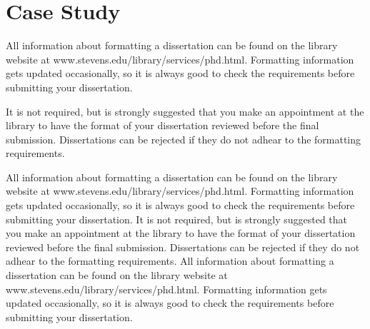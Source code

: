 \chapter{Case Study}
All information about formatting a dissertation can be found on the library website at www.stevens.edu/library/services/phd.html.  Formatting information gets updated occasionally, so it is always good to check the requirements before submitting your dissertation.  

It is not required, but is strongly suggested that you make an appointment at the library to have the format of your dissertation reviewed before the final submission.  Dissertations can be rejected if they do not adhear to the formatting requirements.   

All information about formatting a dissertation can be found on the library website at www.stevens.edu/library/services/phd.html.  Formatting information gets updated occasionally, so it is always good to check the requirements before submitting your dissertation.  
It is not required, but is strongly suggested that you make an appointment at the library to have the format of your dissertation reviewed before the final submission.  Dissertations can be rejected if they do not adhear to the formatting requirements.   
All information about formatting a dissertation can be found on the library website at www.stevens.edu/library/services/phd.html.  Formatting information gets updated occasionally, so it is always good to check the requirements before submitting your dissertation.  

